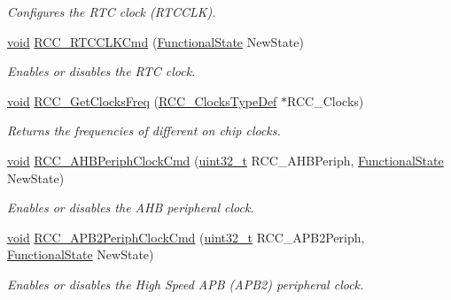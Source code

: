 \begin{DoxyCompactItemize}
\begin{DoxyCompactList}\small\item\em Configures the R\+TC clock (R\+T\+C\+C\+LK). \end{DoxyCompactList}\item 
\hyperlink{usb__devapi_8h_afabf60e7f57651d6d595a02c75f07cd0}{void} \hyperlink{group___r_c_c___private___functions_ga9802f84846df2cea8e369234ed13b159}{R\+C\+C\+\_\+\+R\+T\+C\+C\+L\+K\+Cmd} (\hyperlink{agilefox_2library_2inc_2stm32f10x__type_8h_ac9a7e9a35d2513ec15c3b537aaa4fba1}{Functional\+State} New\+State)
\begin{DoxyCompactList}\small\item\em Enables or disables the R\+TC clock. \end{DoxyCompactList}\item 
\hyperlink{usb__devapi_8h_afabf60e7f57651d6d595a02c75f07cd0}{void} \hyperlink{group___r_c_c___private___functions_ga3e9944fd1ed734275222bbb3e3f29993}{R\+C\+C\+\_\+\+Get\+Clocks\+Freq} (\hyperlink{struct_r_c_c___clocks_type_def}{R\+C\+C\+\_\+\+Clocks\+Type\+Def} $\ast$R\+C\+C\+\_\+\+Clocks)
\begin{DoxyCompactList}\small\item\em Returns the frequencies of different on chip clocks. \end{DoxyCompactList}\item 
\hyperlink{usb__devapi_8h_afabf60e7f57651d6d595a02c75f07cd0}{void} \hyperlink{group___r_c_c___private___functions_gae0b30d8598b8393bdba9c3fefba3a968}{R\+C\+C\+\_\+\+A\+H\+B\+Periph\+Clock\+Cmd} (\hyperlink{_p_e___types_8h_a33594304e786b158f3fb30289278f5af}{uint32\+\_\+t} R\+C\+C\+\_\+\+A\+H\+B\+Periph, \hyperlink{agilefox_2library_2inc_2stm32f10x__type_8h_ac9a7e9a35d2513ec15c3b537aaa4fba1}{Functional\+State} New\+State)
\begin{DoxyCompactList}\small\item\em Enables or disables the A\+HB peripheral clock. \end{DoxyCompactList}\item 
\hyperlink{usb__devapi_8h_afabf60e7f57651d6d595a02c75f07cd0}{void} \hyperlink{group___r_c_c___private___functions_ga56ff55caf8d835351916b40dd030bc87}{R\+C\+C\+\_\+\+A\+P\+B2\+Periph\+Clock\+Cmd} (\hyperlink{_p_e___types_8h_a33594304e786b158f3fb30289278f5af}{uint32\+\_\+t} R\+C\+C\+\_\+\+A\+P\+B2\+Periph, \hyperlink{agilefox_2library_2inc_2stm32f10x__type_8h_ac9a7e9a35d2513ec15c3b537aaa4fba1}{Functional\+State} New\+State)
\begin{DoxyCompactList}\small\item\em Enables or disables the High Speed A\+PB (A\+P\+B2) peripheral clock. \end{DoxyCompactList}\item 

\end{DoxyCompactItemize}
